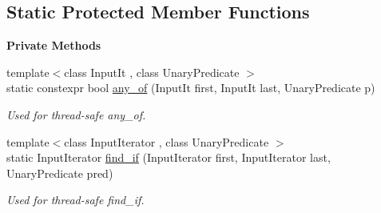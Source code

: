 \subsection*{Static Protected Member Functions}
\begin{Indent}\textbf{ Private Methods}\par
\begin{DoxyCompactItemize}
\item 
\mbox{\label{classrev_1_1_threaded_map_afa61224c4251c924fb6206e662fcbb62}} 
{\footnotesize template$<$class Input\+It , class Unary\+Predicate $>$ }\\static constexpr bool \mbox{\hyperlink{classrev_1_1_threaded_map_afa61224c4251c924fb6206e662fcbb62}{any\+\_\+of}} (Input\+It first, Input\+It last, Unary\+Predicate p)
\begin{DoxyCompactList}\small\item\em Used for thread-\/safe any\+\_\+of. \end{DoxyCompactList}\item 
\mbox{\label{classrev_1_1_threaded_map_a88ea7e1cca68c03404c9e89d630bab2e}} 
{\footnotesize template$<$class Input\+Iterator , class Unary\+Predicate $>$ }\\static Input\+Iterator \mbox{\hyperlink{classrev_1_1_threaded_map_a88ea7e1cca68c03404c9e89d630bab2e}{find\+\_\+if}} (Input\+Iterator first, Input\+Iterator last, Unary\+Predicate pred)
\begin{DoxyCompactList}\small\item\em Used for thread-\/safe find\+\_\+if. \end{DoxyCompactList}\end{DoxyCompactItemize}
\end{Indent}
